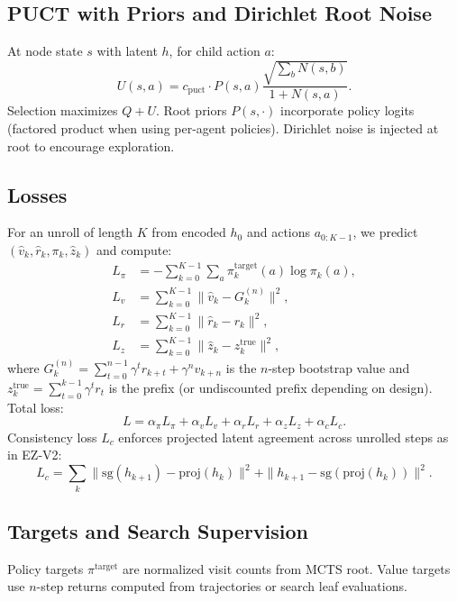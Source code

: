 \documentclass[10pt]{article}
\begin{document}
\subsection{PUCT with Priors and Dirichlet Root Noise}
At node state $s$ with latent $h$, for child action $a$:
\begin{equation}
U(s,a) = c_{\text{puct}} \cdot P(s,a)\frac{\sqrt{\sum_b N(s,b)}}{1+N(s,a)} .
\end{equation}
Selection maximizes $Q+U$. Root priors $P(s,\cdot)$ incorporate policy logits (factored product when using per-agent policies). Dirichlet noise is injected at root to encourage exploration.

\subsection{Losses}
For an unroll of length $K$ from encoded $h_0$ and actions $a_{0:K-1}$, we predict $(\hat v_k,\hat r_k,\pi_k,\hat z_k)$ and compute:
\begin{align}
L_\pi &= -\sum_{k=0}^{K-1}\sum_a \pi^{\text{target}}_k(a)\log \pi_k(a),\\
L_v &= \sum_{k=0}^{K-1} \|\hat v_k - G_k^{(n)}\|^2,\\
L_r &= \sum_{k=0}^{K-1} \|\hat r_k - r_k\|^2,\\
L_z &= \sum_{k=0}^{K-1} \|\hat z_k - z^{\text{true}}_k\|^2,
\end{align}
where $G_k^{(n)}=\sum_{t=0}^{n-1}\gamma^t r_{k+t}+\gamma^n v_{k+n}$ is the $n$-step bootstrap value and $z^{\text{true}}_k=\sum_{t=0}^{k-1}\gamma^t r_t$ is the prefix (or undiscounted prefix depending on design).
Total loss:
\begin{equation}
L = \alpha_\pi L_\pi + \alpha_v L_v + \alpha_r L_r + \alpha_z L_z + \alpha_c L_c .
\end{equation}
Consistency loss $L_c$ enforces projected latent agreement across unrolled steps as in EZ-V2:
\begin{equation}
L_c = \sum_{k}\|\mathrm{sg}(h_{k+1}) - \mathrm{proj}(h_k)\|^2 + \|h_{k+1} - \mathrm{sg}(\mathrm{proj}(h_k))\|^2.
\end{equation}

\subsection{Targets and Search Supervision}
Policy targets $\pi^{\text{target}}$ are normalized visit counts from MCTS root. Value targets use $n$-step returns computed from trajectories or search leaf evaluations.
\end{document}
